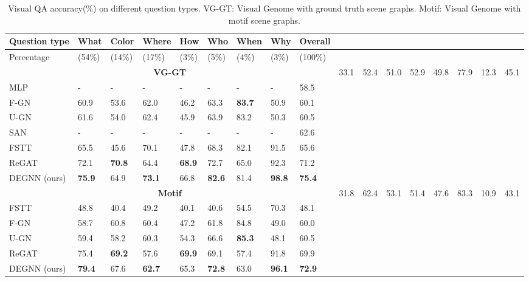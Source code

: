 \documentclass[letterpaper]{article} %
\begin{document}
\begin{table}[ht] 
\centering
    \begin{tabular}{l|lllllllll}
    \hline
    \textbf{Question type}&\textbf{What}&\textbf{Color}&\textbf{Where}&\textbf{How}&\textbf{Who}&\textbf{When}&\textbf{Why}&\textbf{Overall}\\
    \hline
     Percentage &(54\%) &(14\%) &(17\%) &(3\%) &(5\%) &(4\%) &(3\%) &(100\%)\\
    \hline
    \multicolumn{9}{c}{\bf VG-GT} \cr\hline %
     NSM~\cite{DBLP:conf/nips/HudsonM19} &33.1 &52.4 &51.0 &52.9 &49.8 &77.9 &12.3 &45.1\\
     MLP~\cite{DBLP:conf/eccv/JabriJM16} &- &- &- &- &- &- &- &58.5\\
     F-GN~\cite{DBLP:conf/bmvc/ZhangCX19}&60.9 &53.6 &62.0 &46.2 &63.3 &\textbf{83.7} &50.9 &60.1\\
     U-GN~\cite{DBLP:conf/bmvc/ZhangCX19}&61.6 &54.0 &62.4 &45.9 &63.9 & 83.2 &50.3 &60.5\\
     SAN~\cite{DBLP:conf/cvpr/YangHGDS16} &- &- &- &- &- &- &- &62.6\\
     FSTT~\cite{inproceedings} &65.5 &45.6 &70.1 &47.8 &68.3 &82.1 &91.5 &65.6\\
     ReGAT~\cite{DBLP:conf/iccv/LiGCL19} &72.1 &\textbf{70.8} &64.4 &\textbf{68.9} &72.7 &65.0 &92.3 &71.2\\
     DEGNN (ours) &\textbf{75.9} &64.9 &\textbf{73.1} &66.8 &\textbf{82.6} &81.4 &\textbf{98.8} &\textbf{75.4}\\
    \hline
     \multicolumn{9}{c}{\bf Motif} \cr\hline
     NSM &31.8 &62.4 &53.1 &51.4 &47.6 &83.3 &10.9 &43.1\\
     FSTT &48.8 &40.4 &49.2 &40.1 &40.6 &54.5 &70.3 &48.1\\
     F-GN &58.7 &60.8 &60.4 &47.2 &61.8 &84.8 &49.0 &60.0\\
     U-GN &59.4 &58.2 &60.3 &54.3 &66.6 &\textbf{85.3} &48.1 &60.5\\
     ReGAT &75.4 &\textbf{69.2} &57.6 &\textbf{69.9} &69.1 &57.4 &91.8 &69.9\\
     DEGNN (ours) &\textbf{79.4} &67.6 &\textbf{62.7} &65.3 &\textbf{72.8} &63.0 &\textbf{96.1} &\textbf{72.9}\\
    \hline
    \end{tabular}
\caption{\label{VG-detail}
Visual QA accuracy(\%) on different question types. VG-GT: Visual Genome with ground truth scene graphs. Motif: Visual Genome with motif scene graphs.
}
\end{table}
\end{document}

